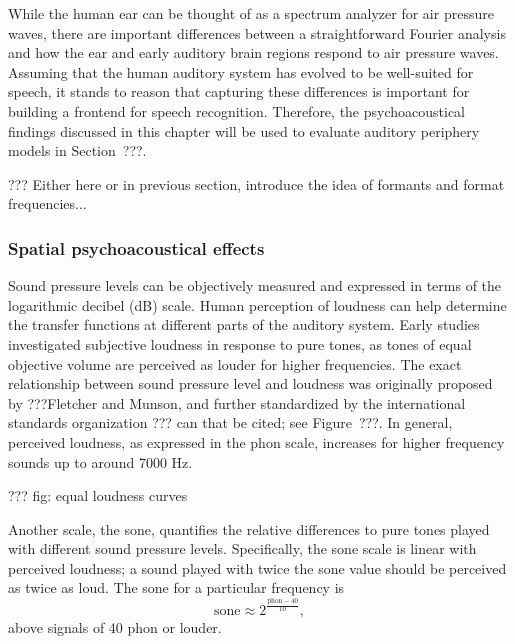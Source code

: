 While the human ear can be thought of
as a spectrum analyzer for air pressure waves,
there are important differences between
a straightforward Fourier analysis
and how the ear and early auditory brain regions
respond to air pressure waves.
Assuming that the human
auditory system has evolved to be
well-suited for speech,
it stands to reason that
capturing these differences
is important for building
a frontend for speech recognition.
Therefore, the psychoacoustical findings
discussed in this chapter will be
used to evaluate auditory periphery models
in Section~???.

??? Either here or in previous section,
introduce the idea of formants
and format frequencies...

\subsubsection{Spatial psychoacoustical effects}

Sound pressure levels can be objectively measured
and expressed in terms of the logarithmic
decibel (dB) scale.
Human perception of loudness can help
determine the transfer functions
at different parts of the auditory system.
Early studies investigated
subjective loudness in response
to pure tones,
as tones of equal objective volume
are perceived as louder for higher frequencies.
The exact relationship between
sound pressure level and
loudness was originally proposed
by ???Fletcher and Munson,
and further standardized
by the international standards organization
??? can that be cited;
see Figure~???.
In general, perceived loudness,
as expressed in the phon scale,
increases for higher frequency sounds
up to around 7000 Hz.

??? fig: equal loudness curves

Another scale, the sone,
quantifies the relative differences
to pure tones played with
different sound pressure levels.
Specifically, the sone scale
is linear with perceived loudness;
a sound played with twice the sone value
should be perceived as twice as loud.
The sone for a particular frequency is
$$\text{sone} \approx 2^{\frac{\text{phon} - 40}{10}},$$
above signals of 40 phon or louder.


